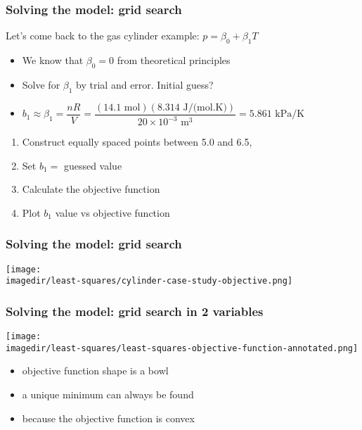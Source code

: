 \begin{frame}\frametitle{Solving the model: grid search}

	Let's come back to the gas cylinder example: $p = \beta_0 + \beta_1 T$
	\begin{itemize}
		\item	We know that $\beta_0 = 0$ from theoretical principles
		\item	Solve for $\beta_1$ by trial and error. Initial guess?
		\item	{\small $b_1 \approx \beta_1 = \dfrac{nR}{V} = \dfrac{(14.1 \,\, \text{mol})(8.314 \,\,\text{J/(mol.K)})}{20 \times 10^{-3} \,\,\text{m}^3} = 5.861 \,\,\text{kPa/K}$}
	\end{itemize}
	\vspace{12pt}
	\begin{enumerate}
		\item	Construct equally spaced points between 5.0 and 6.5,
		\item	Set $b_1 = $ guessed value
		\item	Calculate the objective function
		\item	Plot $b_1$ value vs objective function
	\end{enumerate}
\end{frame}

\begin{frame}\frametitle{Solving the model: grid search}
	\begin{center}
		\texttt{[image: \\imagedir/least-squares/cylinder-case-study-objective.png]}
	\end{center}
\end{frame}

\begin{frame}\frametitle{Solving the model: grid search in 2 variables}
	\begin{center}
		\texttt{[image: \\imagedir/least-squares/least-squares-objective-function-annotated.png]}
	\end{center}
	\begin{itemize}
		\item	objective function shape is a bowl
		\item	a unique minimum can always be found
		\item	because the objective function is convex
	\end{itemize}
\end{frame}

